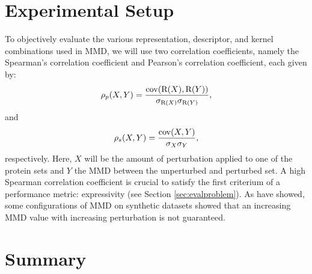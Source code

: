 \section{Experimental Setup}

To objectively evaluate the various representation, descriptor, and kernel
combinations used in MMD, we will use two correlation coefficients, namely the
Spearman's correlation coefficient and Pearson's correlation coefficient, each
given by:
\begin{equation}
  \label{eq:spearman} \rho_p(X,Y) = {\mathrm{cov}(\mathrm{R}(X), \mathrm{R}(Y)) \over
\sigma_{\mathrm{R}(X)}\sigma_{\mathrm{R}(Y)}},
\end{equation} and
\begin{equation}
  \label{eq:spearman} \rho_s(X,Y) = {\mathrm{cov}(X, Y)\over \sigma_X\sigma_Y},
\end{equation}
respectively. Here, $X$ will be the amount of perturbation applied to one of the
protein sets and $Y$ the MMD between the unperturbed and perturbed set. A high
Spearman correlation coefficient is crucial to satisfy the first criterium of a
performance metric: expressivity (see Section \ref{sec:evalproblem}). As
\cite{o2021evaluation} have showed, some configurations of MMD on synthetic
datasets showed that an increasing MMD value with increasing perturbation is not
guaranteed.


\section{Summary}
